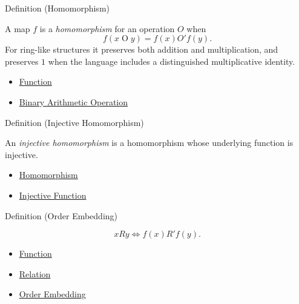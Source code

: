 \begin{definitionbox}{Definition (Homomorphism)}
\begin{definition}[Homomorphism]
\label{def:homomorphism}
A map $f$ is a \emph{homomorphism} for an operation $O$ when
\[
f(x\mathbin{O}y)=f(x)\mathbin{O'}f(y).
\]
For ring-like structures it preserves both addition and multiplication, and
preserves $1$ when the language includes a distinguished multiplicative
identity.
\end{definition}
\end{definitionbox}

\begin{dependencies}
\begin{itemize}
  \item \hyperref[def:function]{Function}
  \item \hyperref[def:binary-arithmetic-operation]{Binary Arithmetic Operation}
\end{itemize}
\end{dependencies}

\begin{definitionbox}{Definition (Injective Homomorphism)}
\begin{definition}
\label{def:injective-homomorphism}
An \emph{injective homomorphism} is a homomorphism whose underlying function
is injective.
\end{definition}
\end{definitionbox}

\begin{dependencies}
\begin{itemize}
  \item \hyperref[def:homomorphism]{Homomorphism}
  \item \hyperref[def:injective]{Injective Function}
\end{itemize}
\end{dependencies}

\begin{definitionbox}{Definition (Order Embedding)}
\begin{definition}
\label{def:abstract-order-embedding}
\[
xRy \Longleftrightarrow f(x)R'f(y).
\]
\end{definition}
\end{definitionbox}

\begin{dependencies}
\begin{itemize}
  \item \hyperref[def:function]{Function}
  \item \hyperref[def:relation]{Relation}
  \item \hyperref[def:order-embedding]{Order Embedding}
\end{itemize}
\end{dependencies}

